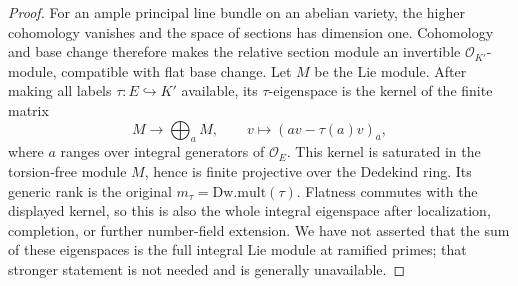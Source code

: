 \begin{proof}
For an ample principal line bundle on an abelian variety,
the higher cohomology vanishes and the space of sections has
dimension one.  Cohomology and base change therefore makes
the relative section module an invertible
\(\mathcal O_{K'}\)-module, compatible with flat base change.
Let \(M\) be the Lie module.  After making all labels
\(\tau:E\hookrightarrow K'\) available, its \(\tau\)-eigenspace
is the kernel of the finite matrix
\[
 M\longrightarrow\bigoplus_a M,\qquad
 v\longmapsto (av-\tau(a)v)_a,
\]
where \(a\) ranges over integral generators of
\(\mathcal O_E\).  This kernel is saturated in the torsion-free
module \(M\), hence is finite projective over the Dedekind
ring.  Its generic rank is the original \(m_\tau=\mathrm{Dw.mult}(\tau)\).
Flatness commutes with the displayed kernel, so this is also
the whole integral eigenspace after localization, completion,
or further number-field extension.  We have not asserted
that the sum of these eigenspaces is the full integral Lie
module at ramified primes; that stronger statement is not
needed and is generally unavailable.
\end{proof}

